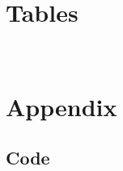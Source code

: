 \documentclass[12pt]{article}
\begin{document}
\section{Tables}
\
\section{Appendix}

\subsection{Code}

\begin{verbatim}

\end{verbatim}




\end{document}
